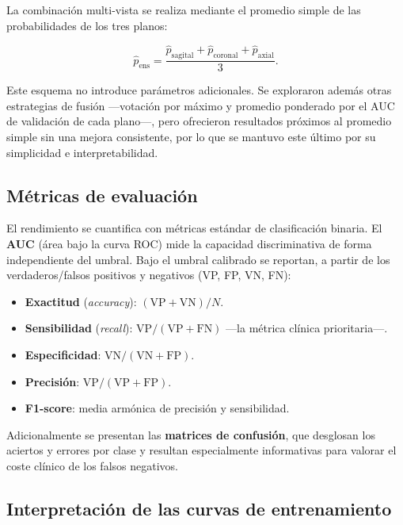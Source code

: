 La combinación multi-vista se realiza mediante el promedio simple de las probabilidades de los tres planos:

\begin{equation}
\hat{p}_{\mathrm{ens}} = \frac{\hat{p}_{\mathrm{sagital}} + \hat{p}_{\mathrm{coronal}} + \hat{p}_{\mathrm{axial}}}{3}.
\label{eq:ensemble_promedio}
\end{equation}

Este esquema no introduce parámetros adicionales. Se exploraron además otras estrategias de fusión ---votación por máximo y promedio ponderado por el AUC de validación de cada plano---, pero ofrecieron resultados próximos al promedio simple sin una mejora consistente, por lo que se mantuvo este último por su simplicidad e interpretabilidad.

\subsection{Métricas de evaluación}

El rendimiento se cuantifica con métricas estándar de clasificación binaria. El \textbf{AUC} (área bajo la curva ROC) mide la capacidad discriminativa de forma independiente del umbral. Bajo el umbral calibrado se reportan, a partir de los verdaderos/falsos positivos y negativos (VP, FP, VN, FN):

\begin{itemize}
    \item \textbf{Exactitud} (\textit{accuracy}): $(\mathrm{VP}+\mathrm{VN})/N$.
    \item \textbf{Sensibilidad} (\textit{recall}): $\mathrm{VP}/(\mathrm{VP}+\mathrm{FN})$ ---la métrica clínica prioritaria---.
    \item \textbf{Especificidad}: $\mathrm{VN}/(\mathrm{VN}+\mathrm{FP})$.
    \item \textbf{Precisión}: $\mathrm{VP}/(\mathrm{VP}+\mathrm{FP})$.
    \item \textbf{F1-score}: media armónica de precisión y sensibilidad.
\end{itemize}

Adicionalmente se presentan las \textbf{matrices de confusión}, que desglosan los aciertos y errores por clase y resultan especialmente informativas para valorar el coste clínico de los falsos negativos.

\subsection{Interpretación de las curvas de entrenamiento}


